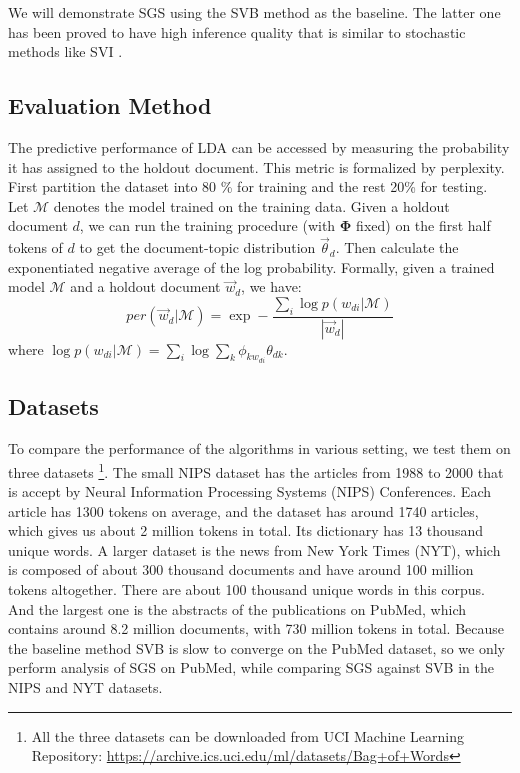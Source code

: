 \documentclass{article}
\begin{document}
We will demonstrate SGS using the SVB method \cite{broderick2013streaming} as the baseline. The latter one has been proved to have high inference quality that is similar to stochastic methods like SVI \cite{hoffman2013stochastic}. 

\subsection{Evaluation Method}
The predictive performance of LDA can be accessed by measuring the probability it has assigned to the holdout document. This metric is formalized by perplexity. First partition the dataset into 80 \% for training and the rest 20\% for testing. Let $\mathcal{M}$ denotes the model trained on the training data. Given a holdout document $d$, we can run the training procedure (with $\bm{\Phi}$ fixed) on the first half tokens of $d$ to get the document-topic distribution $\vec{\theta}_d$. Then calculate the exponentiated negative average of the log probability. Formally, given a trained model $\mathcal{M}$ and a holdout document $\vec{w}_{d}$, we have:
$$per(\vec{w}_{d}|\mathcal{M})=\exp-\frac{\sum_i \log p(w_{di}|\mathcal{M})}{|\vec{w}_{d}|}$$
where $\log p(w_{di}|\mathcal{M})=\sum_i \log {\sum_k \phi_{kw_{di}}\theta_{dk}}$. 

\subsection{Datasets}
To compare the performance of the algorithms in various setting, we test them on three datasets \footnote{All the three datasets can be downloaded from UCI Machine Learning Repository: \url{https://archive.ics.uci.edu/ml/datasets/Bag+of+Words}}. The small NIPS dataset \cite{pereiraeuclidean} has the articles from 1988 to 2000 that is accept by Neural Information Processing Systems (NIPS) Conferences. Each article has 1300 tokens on average, and the dataset has around 1740 articles, which gives us about 2 million tokens in total. Its dictionary has 13 thousand unique words. A larger dataset is the news from New York Times (NYT), which is composed of about 300 thousand documents and have around 100 million tokens altogether. There are about 100 thousand unique words in this corpus. And the largest one is the abstracts of the publications on PubMed, which contains around 8.2 million documents, with 730 million tokens in total\cite{UCI+Bache+Lichman:2013}. Because the baseline method SVB is slow to converge on the PubMed dataset, so we only perform analysis of SGS on PubMed, while comparing SGS against SVB in the NIPS and NYT datasets.
\end{document}
